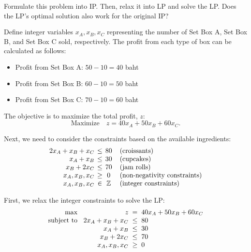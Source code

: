 \documentclass[a4paper, 10pt]{article}
\begin{document}
\begin{subproblems_alpha}
    \item Formulate this problem into IP.
    Then, relax it into LP and solve the LP.
    Does the LP's optimal solution also work for the original IP?
\end{subproblems_alpha}

\begin{solution}
Define integer variables \( x_A, x_B, x_C \) representing the number of Set Box A, Set Box B, and Set Box C sold, respectively.
The profit from each type of box can be calculated as follows:
\begin{itemize}
    \item Profit from Set Box A: \( 50 - 10 = 40 \) baht
    \item Profit from Set Box B: \( 60 - 10 = 50 \) baht
    \item Profit from Set Box C: \( 70 - 10 = 60 \) baht
\end{itemize}

The objective is to maximize the total profit, \( z \):
\[ \text{Maximize} \quad z = 40x_A + 50x_B + 60x_C. \]

Next, we need to consider the constraints based on the available ingredients:
\[
\begin{array}{r @{\hspace{1.5mm}} c @{\hspace{1.5mm}} c @{\hspace{4mm}} l}
    2x_A + x_B + x_C & \leq & 80 & \text{(croissants)} \\
    x_A + x_B & \leq & 30 & \text{(cupcakes)} \\
    x_B + 2x_C & \leq & 70 & \text{(jam rolls)} \\
    x_A, x_B, x_C & \geq & 0 & \text{(non-negativity constraints)} \\
    x_A, x_B, x_C & \in & \mathbb{Z} & \text{(integer constraints)} \\
\end{array}
\]

First, we relax the integer constraints to solve the LP:
\[
\begin{array}{@{\hspace{2mm}} r @{\hspace{2mm}} r @{\hspace{2mm}} c @{\hspace{2mm}} l}
    \text{max } & z & = & 40x_A + 50x_B + 60x_C \\
    \text{subject to } & 2x_A + x_B + x_C & \leq & 80 \\
    & x_A + x_B & \leq & 30 \\
    & x_B + 2x_C & \leq & 70 \\
    & x_A, x_B, x_C & \geq & 0
\end{array}
\]


\end{solution}
\end{document}
